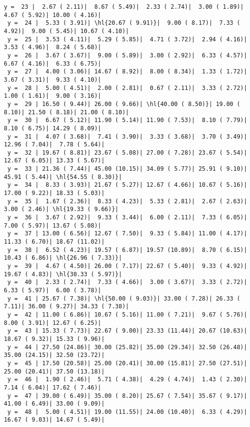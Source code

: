 \documentclass[10pt]{article}
\newcommand{\hl}[1]{\textcolor{blue}{#1}}
\begin{document}
\begin{Verbatim}[fontsize=\small, commandchars=\\\{\}]
 y =  23 |  2.67 ( 2.11)|  8.67 ( 5.49)|  2.33 ( 2.74)|  3.00 ( 1.89)|  4.67 ( 5.92)| 10.00 ( 4.16)|
 y =  24 |  5.33 ( 3.91)| \hl{20.67 ( 9.91)}|  9.00 ( 8.17)|  7.33 ( 4.92)|  9.00 ( 5.45)| 10.67 ( 4.10)|
 y =  25 |  3.53 ( 4.11)|  5.29 ( 5.85)|  4.71 ( 3.72)|  2.94 ( 4.16)|  3.53 ( 4.96)|  8.24 ( 5.68)|
 y =  26 |  3.67 ( 3.67)|  9.00 ( 5.89)|  3.00 ( 2.92)|  6.33 ( 4.57)|  6.67 ( 4.16)|  6.33 ( 6.75)|
 y =  27 |  4.00 ( 3.06)| 14.67 ( 8.92)|  8.00 ( 8.34)|  1.33 ( 1.72)|  3.67 ( 3.31)|  9.33 ( 4.10)|
 y =  28 |  5.00 ( 4.51)|  2.00 ( 2.81)|  0.67 ( 2.11)|  3.33 ( 2.72)|  1.00 ( 1.61)|  9.00 ( 3.16)|
 y =  29 | 16.50 ( 9.44)| 26.00 ( 9.66)| \hl{40.00 ( 8.50)}| 19.00 ( 8.10)| 21.50 ( 8.18)| 21.00 ( 8.10)|
 y =  30 |  6.67 ( 5.12)| 11.90 ( 5.14)| 11.90 ( 7.53)|  8.10 ( 7.79)|  8.10 ( 6.75)| 14.29 ( 8.09)|
 y =  31 |  4.07 ( 3.68)|  7.41 ( 3.90)|  3.33 ( 3.68)|  3.70 ( 3.49)| 12.96 ( 7.04)|  7.78 ( 5.64)|
 y =  32 | 19.67 ( 8.81)| 23.67 ( 5.08)| 27.00 ( 7.28)| 23.67 ( 5.54)| 12.67 ( 6.05)| 13.33 ( 5.67)|
 y =  33 | 21.36 ( 7.44)| 45.00 (10.15)| 34.09 ( 5.77)| 25.91 ( 9.10)| 45.91 ( 5.44)| \hl{54.55 ( 8.30)}|
 y =  34 |  8.33 ( 3.93)| 21.67 ( 5.27)| 12.67 ( 4.66)| 10.67 ( 5.16)| 17.00 ( 9.22)| 18.33 ( 5.03)|
 y =  35 |  1.67 ( 2.36)|  8.33 ( 4.23)|  5.33 ( 2.81)|  2.67 ( 2.63)|  3.00 ( 2.46)| \hl{19.33 ( 9.66)}|
 y =  36 |  3.67 ( 2.92)|  9.33 ( 3.44)|  6.00 ( 2.11)|  7.33 ( 6.05)|  7.00 ( 5.97)| 13.67 ( 5.08)|
 y =  37 | 13.00 ( 6.56)| 12.67 ( 7.50)|  9.33 ( 5.84)| 11.00 ( 4.17)| 11.33 ( 6.70)| 18.67 (11.02)|
 y =  38 |  6.52 ( 4.23)| 19.57 ( 6.87)| 19.57 (10.89)|  8.70 ( 6.15)| 10.43 ( 6.86)| \hl{26.96 ( 7.33)}|
 y =  39 |  4.67 ( 4.50)| 26.00 ( 7.17)| 22.67 ( 5.40)|  9.33 ( 4.92)| 19.67 ( 4.83)| \hl{30.33 ( 5.97)}|
 y =  40 |  2.33 ( 2.74)|  7.33 ( 4.66)|  3.00 ( 3.67)|  3.33 ( 2.72)|  6.33 ( 5.97)|  6.00 ( 3.78)|
 y =  41 | 25.67 ( 7.38)| \hl{50.00 ( 9.03)}| 33.00 ( 7.28)| 26.33 ( 7.11)| 36.00 ( 9.27)| 34.33 ( 7.38)|
 y =  42 | 11.00 ( 6.86)| 10.67 ( 5.16)| 11.00 ( 7.21)|  9.67 ( 5.76)|  8.00 ( 3.91)| 12.67 ( 6.25)|
 y =  43 | 15.33 ( 7.73)| 22.67 ( 9.00)| 23.33 (11.44)| 20.67 (10.63)| 18.67 ( 9.32)| 15.33 ( 9.96)|
 y =  44 | 27.50 (24.86)| 30.00 (25.82)| 35.00 (29.34)| 32.50 (26.48)| 35.00 (24.15)| 32.50 (23.72)|
 y =  45 | 17.50 (20.58)| 25.00 (20.41)| 30.00 (15.81)| 27.50 (27.51)| 25.00 (20.41)| 37.50 (13.18)|
 y =  46 |  1.90 ( 2.46)|  5.71 ( 4.38)|  4.29 ( 4.74)|  1.43 ( 2.30)|  7.14 ( 6.04)| 17.62 ( 7.46)|
 y =  47 | 39.00 ( 6.49)| 35.00 ( 8.20)| 25.67 ( 7.54)| 35.67 ( 9.17)| 41.00 ( 6.49)| 33.00 ( 9.09)|
 y =  48 |  5.00 ( 4.51)| 19.00 (11.55)| 24.00 (10.40)|  6.33 ( 4.29)| 16.67 ( 9.03)| 14.67 ( 5.49)|

\end{Verbatim}
\end{document}
